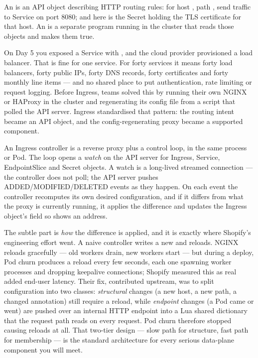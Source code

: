 
 An  is an API object describing HTTP routing rules: for host , path , send traffic to Service  on port 8080; and here is the Secret holding the TLS certificate for that host. An  is a separate program running in the cluster that reads those objects and makes them true.

 On Day 5 you exposed a Service with , and the cloud provider provisioned a load balancer. That is fine for one service. For forty services it means forty load balancers, forty public IPs, forty DNS records, forty certificates and forty monthly line items --- and no shared place to put authentication, rate limiting or request logging. Before Ingress, teams solved this by running their own NGINX or HAProxy in the cluster and regenerating its config file from a script that polled the API server. Ingress standardised that pattern: the routing intent became an API object, and the config-regenerating proxy became a supported component.

 An Ingress controller is a reverse proxy plus a control loop, in the same process or Pod. The loop opens a \emph{watch} on the API server for Ingress, Service, EndpointSlice and Secret objects. A watch is a long-lived streamed connection --- the controller does not poll; the API server pushes ADDED/MODIFIED/DELETED events as they happen. On each event the controller recomputes its own desired configuration, and if it differs from what the proxy is currently running, it applies the difference and updates the Ingress object's  field so  shows an address.

The subtle part is \emph{how} the difference is applied, and it is exactly where Shopify's engineering effort went. A naive controller writes a new  and reloads. NGINX reloads gracefully --- old workers drain, new workers start --- but during a deploy, Pod churn produces a reload every few seconds, each one spawning worker processes and dropping keepalive connections; Shopify measured this as real added end-user latency. Their fix, contributed upstream, was to split configuration into two classes: \emph{structural} changes (a new host, a new path, a changed annotation) still require a reload, while \emph{endpoint} changes (a Pod came or went) are pushed over an internal HTTP endpoint into a Lua shared dictionary that the request path reads on every request. Pod churn therefore stopped causing reloads at all. That two-tier design --- slow path for structure, fast path for membership --- is the standard architecture for every serious data-plane component you will meet.

